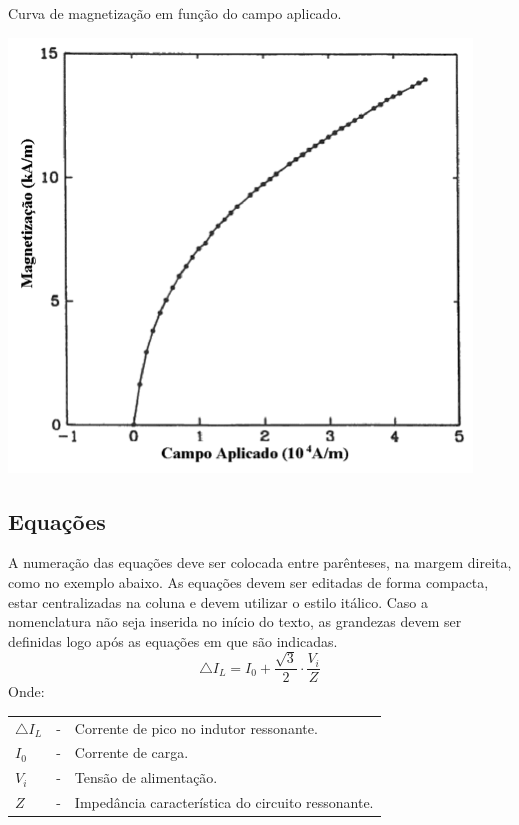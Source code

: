 \documentclass{ceel}
\begin{document}
\begin{multicols}{2}
\begin{minipage}[h]{\columnwidth}
\centering
\captionsetup{type=figure}
\caption{Curva de magnetização em função do campo aplicado.} \includegraphics[scale=1]{figura}
\label{fig1}
\end{minipage}

\subsection{Equações}
A numeração das equações deve ser colocada entre parênteses, na margem direita, como no exemplo abaixo. As equações devem ser editadas de forma compacta, estar centralizadas na coluna e devem utilizar o estilo itálico. Caso a nomenclatura não seja inserida no início do texto, as grandezas devem ser definidas logo após as equações em que são indicadas.
\begin{equation}
\bigtriangleup I_L=I_0+\frac{\sqrt{3}}{2}\cdot\frac{V_i}{Z}
\end{equation}
Onde:\\

\begin{tabular}{lrl}
$\bigtriangleup I_L$ &-&Corrente de pico no indutor ressonante.\\
$I_0$&-&Corrente de carga.\\
$V_i$&-&Tensão de alimentação.\\
$Z$&-&Impedância característica do circuito ressonante.
\end{tabular}


\end{multicols}
\end{document}
